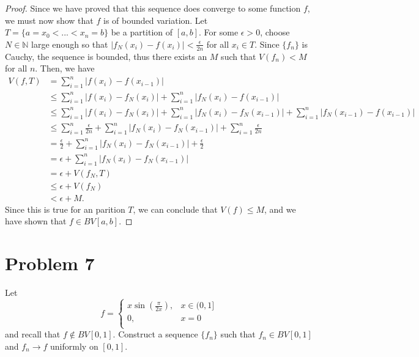 \documentclass[10pt,a4paper]{article}
\theoremstyle{theorem}
\theoremstyle{definition}
\begin{document}
\begin{proof}
Since we have proved that this sequence does converge to some function $f$, we must now show that $f$ is of bounded variation. Let $T = \{a = x_0 < ... < x_n = b\}$ be a partition of $[a, b]$. For some $\epsilon > 0$, choose $N \in \mathbb{N}$ large enough so that $|f_N(x_i) - f(x_i)| < \frac{\epsilon}{2n}$ for all $x_i \in T$. Since $\{f_n\}$ is Cauchy, the sequence is bounded, thus there exists an $M$ such that $V(f_n) < M$ for all $n$. Then, we have
\begin{align*}
V(f, T) &= \sum_{i=1}^n |f(x_i) - f(x_{i - 1})|\\
&\leq \sum_{i=1}^n |f(x_i) - f_N(x_i)| + \sum_{i=1}^n |f_N(x_i) - f(x_{i - 1})| \\
&\leq \sum_{i=1}^n |f(x_i) - f_N(x_i)|  + \sum_{i=1}^n |f_N(x_i) - f_N(x_{i - 1})| + \sum_{i=1}^n |f_N(x_{i-1}) - f(x_{i - 1})| \\
&\leq \sum_{i=1}^n \frac{\epsilon}{2n}  + \sum_{i=1}^n |f_N(x_i) - f_N(x_{i - 1})| + \sum_{i=1}^n \frac{\epsilon}{2n} \\
&= \frac{\epsilon}{2} + \sum_{i=1}^n |f_N(x_i) - f_N(x_{i - 1})| + \frac{\epsilon}{2}\\
&= \epsilon + \sum_{i=1}^n |f_N(x_i) - f_N(x_{i - 1})|\\
&= \epsilon + V(f_N, T)\\
&\leq \epsilon + V(f_N)\\
&< \epsilon + M.
\end{align*}
Since this is true for an parition $T$, we can conclude that $V(f) \leq M$, and we have shown that $f \in BV[a, b]$.
\end{proof}

\section*{Problem 7}
Let 
\[   f = \left\{
\begin{array}{ll}
      x \sin \left( \frac{\pi}{2x} \right), &  x \in (0, 1]\\
      0, & x = 0\\
\end{array} 
\right. \]
and recall that $f \not \in BV[0, 1]$. Construct a sequence $\{f_n\}$ such that $f_n \in BV[0, 1]$ and $f_n \to f$ uniformly on $[0, 1]$.
\end{document}
